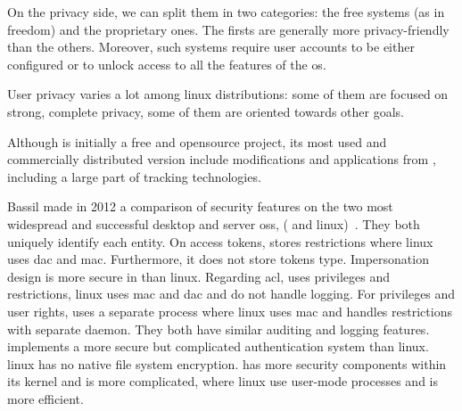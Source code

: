 On the privacy side, we can split them in two categories: the free systems (as in freedom) and the proprietary ones. The firsts are generally more privacy-friendly than the others. Moreover, such systems require user accounts to be either configured or to unlock access to all the features of the \gls{os}.

User privacy varies a lot among \gls{linux} distributions: some of them are focused on strong, complete privacy, some of them are oriented towards other goals. %

Although  is initially a free and \gls{opensource} project, its most used and commercially distributed version include modifications and applications from , including a large part of tracking technologies.

Bassil made in 2012 a comparison of security features on the two most widespread and successful desktop and server \glspl{os}, ( and \gls{linux})~\cite{bassil_windows_2012}. They both uniquely identify each entity. On access tokens,  stores restrictions where \gls{linux} uses \gls{dac} and \gls{mac}. Furthermore, it does not store tokens type. Impersonation design is more secure in  than \gls{linux}. Regarding \gls{acl},  uses privileges and restrictions, \gls{linux} uses \gls{mac} and \gls{dac} and do not handle logging. For privileges and user rights,  uses a separate process where \gls{linux} uses \gls{mac} and handles restrictions with separate daemon. They both have similar auditing and logging features.  implements a more secure but complicated authentication system than \gls{linux}. \Gls{linux} has no native file system encryption.  has more security components within its kernel and is more complicated, where \gls{linux} use user-mode processes and is more efficient. %

